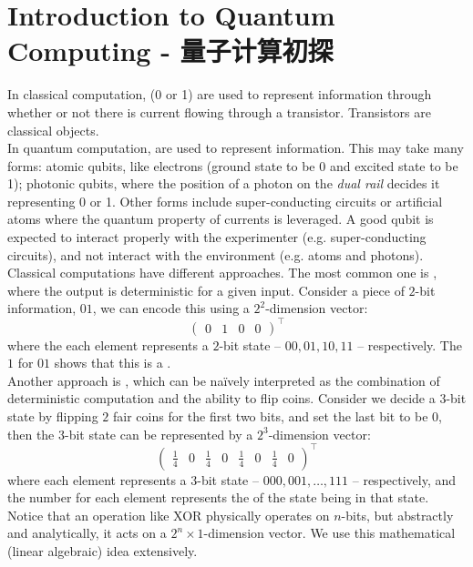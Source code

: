 \section{Introduction to Quantum Computing - 量子计算初探}
In classical computation,  (0 or 1) are used to represent information through whether or not there is current flowing through a transistor. Transistors are classical objects. \\
In quantum computation,  are used to represent information. This may take many forms: atomic qubits, like electrons (ground state to be 0 and excited state to be 1); photonic qubits, where the position of a photon on the \textit{dual rail} decides it representing 0 or 1. Other forms include super-conducting circuits or artificial atoms where the quantum property of currents is leveraged. A good qubit is expected to interact properly with the experimenter (e.g. super-conducting circuits), and not interact with the environment (e.g. atoms and photons). \\
Classical computations have different approaches. The most common one is , where the output is deterministic for a given input. Consider a piece of $2$-bit information, $01$, we can encode this using a $2^2$-dimension vector:
$$\begin{pmatrix}
    0 & 1 & 0 & 0
\end{pmatrix}^\top$$
where the each element represents a $2$-bit state -- $00, 01, 10, 11$ -- respectively. The $1$ for $01$ shows that this is a . \\
Another approach is , which can be na\"ively interpreted as the combination of deterministic computation and the ability to flip coins. Consider we decide a $3$-bit state by flipping $2$ fair coins for the first two bits, and set the last bit to be $0$, then the $3$-bit state can be represented by a $2^3$-dimension vector:
$$\begin{pmatrix}
    \frac{1}{4} & 0 & \frac{1}{4} & 0 & \frac{1}{4} & 0 & \frac{1}{4} & 0
\end{pmatrix}^\top$$
where each element represents a $3$-bit state -- $000, 001, \dots, 111$ -- respectively, and the number for each element represents the  of the state being in that state. \\
Notice that an operation like XOR physically operates on $n$-bits, but abstractly and analytically, it acts on a $2^n \times 1$-dimension vector. We use this mathematical (linear algebraic) idea extensively. \\
